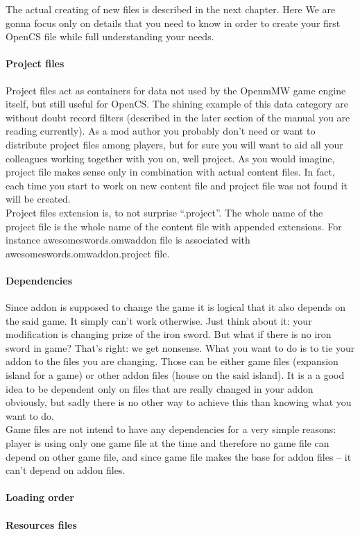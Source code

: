 
The actual creating of new files is described in the next chapter. Here We are gonna focus only on details that you need to know in order to create your first Open{CS} file while full understanding your needs.

\paragraph{Project files}
Project files act as containers for data not used by the Openm{MW} game engine itself, but still useful for OpenCS. The shining example of this data category are without doubt record filters (described in the later section of the manual you are reading currently). As a mod author you probably don't need or want to distribute project files among players, but for sure you will want to aid all your colleagues working together with you on, well project. As you would imagine, project file makes sense only in combination with actual content files. In fact, each time you start to work on new content file and project file was not found it will be created.\\ 
Project files extension is, to not surprise ``.project''. The whole name of the project file is the whole name of the content file with appended extensions. For instance awesomeswords.omwaddon file is associated with awesomeswords.omwaddon.project file.


\paragraph{Dependencies}
Since addon is supposed to change the game it is logical that it also depends on the said game. It simply can't work otherwise. Just think about it: your modification is changing prize of the iron sword. But what if there is no iron sword in game? That's right: we get nonsense. What you want to do is to tie your addon to the files you are changing. Those can be either game files (expansion island for a game) or other addon files (house on the said island). It is a a good idea to be dependent only on files that are really changed in your addon obviously, but sadly there is no other way to achieve this than knowing what you want to do.\\

Game files are not intend to have any dependencies for a very simple reasons: player is using only one game file at the time and therefore no game file can depend on other game file, and since game file makes the base for addon files -- it can't depend on addon files.

\paragraph{Loading order}

\paragraph{Resources files}
